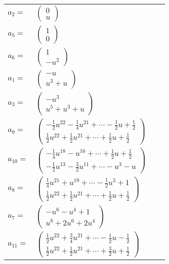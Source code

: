 \documentclass[1p]{elsarticle_modified}
\theoremstyle{definition}
\begin{document}
\begin{tabular}{m{7pt} m{180pt} m{7pt} m{180pt} }
\flushright $a_{2}=$&$\begin{pmatrix}0\\u\end{pmatrix}$ \\
\flushright $a_{5}=$&$\begin{pmatrix}1\\0\end{pmatrix}$ \\
\flushright $a_{6}=$&$\begin{pmatrix}1\\- u^2\end{pmatrix}$ \\
\flushright $a_{1}=$&$\begin{pmatrix}- u\\u^3+u\end{pmatrix}$ \\
\flushright $a_{3}=$&$\begin{pmatrix}- u^3\\u^5+u^3+u\end{pmatrix}$ \\
\flushright $a_{9}=$&$\begin{pmatrix}-\frac{1}{2} u^{22}-\frac{1}{4} u^{21}+\cdots-\frac{1}{2} u+\frac{1}{2}\\\frac{1}{2} u^{22}+\frac{1}{2} u^{21}+\cdots+\frac{1}{2} u+\frac{1}{2}\end{pmatrix}$ \\
\flushright $a_{10}=$&$\begin{pmatrix}-\frac{1}{4} u^{18}- u^{16}+\cdots+\frac{1}{2} u+\frac{1}{2}\\-\frac{1}{2} u^{13}-\frac{3}{2} u^{11}+\cdots- u^3- u\end{pmatrix}$ \\
\flushright $a_{8}=$&$\begin{pmatrix}\frac{1}{4} u^{21}+u^{19}+\cdots-\frac{1}{2} u^3+1\\\frac{1}{2} u^{22}+\frac{1}{2} u^{21}+\cdots+\frac{1}{2} u+\frac{1}{2}\end{pmatrix}$ \\
\flushright $a_{7}=$&$\begin{pmatrix}- u^6- u^4+1\\u^8+2 u^6+2 u^4\end{pmatrix}$ \\
\flushright $a_{11}=$&$\begin{pmatrix}\frac{1}{2} u^{22}+\frac{3}{4} u^{21}+\cdots-\frac{1}{2} u-\frac{1}{2}\\\frac{1}{2} u^{22}+\frac{1}{2} u^{21}+\cdots+\frac{3}{2} u+\frac{1}{2}\end{pmatrix}$ \\

\end{tabular}
\end{document}
